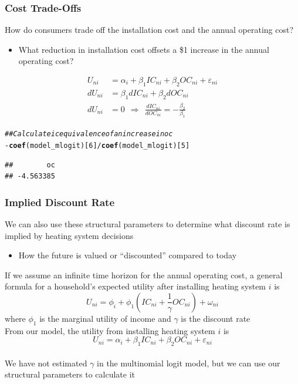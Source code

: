\documentclass{beamer}\usepackage[]{graphicx}\usepackage[]{xcolor}
\makeatletter
\newcommand{\hlnum}[1]{\textcolor[rgb]{0.686,0.059,0.569}{#1}}%
\newcommand{\hlcom}[1]{\textcolor[rgb]{0.678,0.584,0.686}{\textit{#1}}}%
\newcommand{\hlopt}[1]{\textcolor[rgb]{0,0,0}{#1}}%
\newcommand{\hlstd}[1]{\textcolor[rgb]{0.345,0.345,0.345}{#1}}%
\newcommand{\hlkwd}[1]{\textcolor[rgb]{0.737,0.353,0.396}{\textbf{#1}}}%
\newenvironment{kframe}{%
 \def\at@end@of@kframe{}%
 \ifinner\ifhmode%
  \def\at@end@of@kframe{\end{minipage}}%
  \begin{minipage}{\columnwidth}%
 \fi\fi%
 \def\FrameCommand##1{\hskip\@totalleftmargin \hskip-\fboxsep
 \colorbox{shadecolor}{##1}\hskip-\fboxsep
     \hskip-\linewidth \hskip-\@totalleftmargin \hskip\columnwidth}%
 \MakeFramed {\advance\hsize-\width
   \@totalleftmargin\z@ \linewidth\hsize
   \@setminipage}}%
 {\par\unskip\endMakeFramed%
 \at@end@of@kframe}
\newenvironment{knitrout}{}{} %
\makeatother
\begin{document}
\begin{frame}[fragile]\frametitle{Cost Trade-Offs}
    How do consumers trade off the installation cost and the annual operating cost?
    \begin{itemize}
        \item What reduction in installation cost offsets a \$1 increase in the annual operating cost?
    \end{itemize}
    \begin{align*}
        U_{ni} & = \alpha_i + \beta_1 IC_{ni} + \beta_2 OC_{ni} + \varepsilon_{ni} \\
        dU_{ni} & = \beta_1 dIC_{ni} + \beta_2 dOC_{ni} \\
        dU_{ni} & = 0 ~~ \Rightarrow ~~ \frac{dIC_{ni}}{dOC_{ni}} = -\frac{\beta_2}{\beta_1}
    \end{align*}
\begin{knitrout}\footnotesize
{}\color{fgcolor}\begin{kframe}
\begin{alltt}
\hlcom{## Calculate ic equivalence of an increase in oc}
\hlopt{-}\hlkwd{coef}\hlstd{(model_mlogit)[}\hlnum{6}\hlstd{]} \hlopt{/} \hlkwd{coef}\hlstd{(model_mlogit)[}\hlnum{5}\hlstd{]}
\end{alltt}
\begin{verbatim}
##        oc 
## -4.563385
\end{verbatim}
\end{kframe}
\end{knitrout}
\end{frame}

\begin{frame}\frametitle{Implied Discount Rate}
    We can also use these structural parameters to determine what discount rate is implied by heating system decisions
    \begin{itemize}
        \item How the future is valued or ``discounted'' compared to today
    \end{itemize}
    \vspace{2ex}
    If we assume an infinite time horizon for the annual operating cost, a general formula for a household's expected utility after installing heating system $i$ is
    $$U_{ni} = \phi_i + \phi_1 \left( IC_{ni} + \frac{1}{\gamma} OC_{ni} \right) + \omega_{ni}$$
    where $\phi_1$ is the marginal utility of income and $\gamma$ is the discount rate \\
    \vspace{2ex}
    From our model, the utility from installing heating system $i$ is
    $$U_{ni} = \alpha_i + \beta_1 IC_{ni} + \beta_2 OC_{ni} + \varepsilon_{ni}$$ \\
    \vspace{1ex}
    We have not estimated $\gamma$ in the multinomial logit model, but we can use our structural parameters to calculate it
\end{frame}
\end{document}
